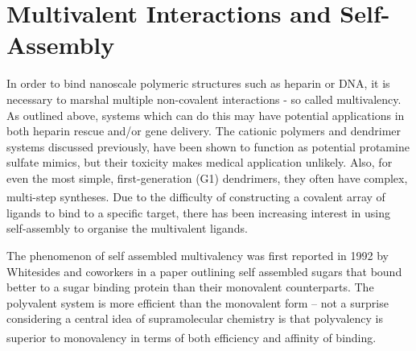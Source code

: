 \section{Multivalent Interactions and Self-Assembly}
In order to bind nanoscale polymeric structures such as heparin or DNA, it is necessary to marshal multiple non-covalent interactions - so called multivalency. As outlined above, systems which can do this may have potential applications in both heparin rescue and/or gene delivery. The cationic polymers and dendrimer systems discussed previously, have been shown to function as potential protamine sulfate mimics, but their toxicity makes medical application unlikely. Also, for even the most simple, first-generation (G1) dendrimers, they often have complex, multi-step syntheses.\textsuperscript{\cite{Rodrigo2011Self-AssemblingBinding}} Due to the difficulty of constructing a covalent array of ligands to bind to a specific target, there has been increasing interest in using self-assembly to organise the multivalent ligands. 

The phenomenon of self assembled multivalency was first reported in 1992 by Whitesides and coworkers in a paper outlining self assembled sugars that bound better to a sugar binding protein than their monovalent counterparts. The polyvalent system is more efficient than the monovalent form – not a surprise considering a central idea of supramolecular chemistry is that polyvalency is superior to monovalency in terms of both efficiency and affinity of binding.\textsuperscript{\cite{Kingery-Wood1992TheGangliosides}} 

